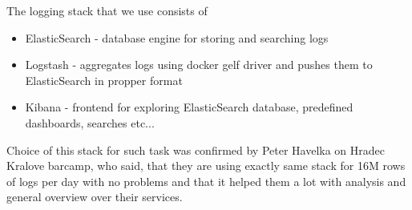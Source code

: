 The logging stack that we use consists of 
\begin{itemize}
	\item ElasticSearch - database engine for storing and searching logs
	\item Logstash - aggregates logs using docker gelf driver and pushes them to ElasticSearch in propper format
	\item Kibana - frontend for exploring ElasticSearch database, predefined dashboards, searches etc...
\end{itemize}

Choice of this stack for such task was confirmed by Peter Havelka on Hradec Kralove barcamp, who said, that they are using exactly same stack for 16M rows of logs per day with no problems and that it helped them a lot with analysis and general overview over their services. \cite{docker_elk_useability}


